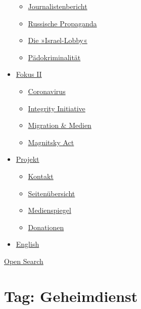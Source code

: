 \begin{itemize}
  \begin{itemize}
  \tightlist
  \item
    \href{https://swprs.org/bericht-eines-journalisten/}{Journalistenbericht}
  \item
    \href{https://swprs.org/russische-propaganda/}{Russische Propaganda}
  \item
    \href{https://swprs.org/die-israel-lobby-fakten-und-mythen/}{Die
    »Israel-Lobby«}
  \item
    \href{https://swprs.org/geopolitik-und-paedokriminalitaet/}{Pädokriminalität}
  \end{itemize}
\item
  \href{https://swprs.org/migration-und-medien/}{Fokus II}

  \begin{itemize}
  \tightlist
  \item
    \href{https://swprs.org/covid-19-hinweis-ii/}{Coronavirus}
  \item
    \href{https://swprs.org/die-integrity-initiative/}{Integrity
    Initiative}
  \item
    \href{https://swprs.org/migration-und-medien/}{Migration \& Medien}
  \item
    \href{https://swprs.org/der-fall-magnitsky/}{Magnitsky Act}
  \end{itemize}
\item
  \href{https://swprs.org/kontakt/}{Projekt}

  \begin{itemize}
  \tightlist
  \item
    \href{https://swprs.org/kontakt/}{Kontakt}
  \item
    \href{https://swprs.org/uebersicht/}{Seitenübersicht}
  \item
    \href{https://swprs.org/medienspiegel/}{Medienspiegel}
  \item
    \href{https://swprs.org/donationen/}{Donationen}
  \end{itemize}
\item
  \href{https://swprs.org/contact/}{English}
\end{itemize}

\protect\hyperlink{}{Open Search}

\hypertarget{tag-geheimdienst}{%
\section{Tag: Geheimdienst}\label{tag-geheimdienst}}

